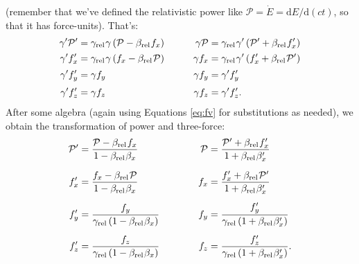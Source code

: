 \documentclass[12pt]{article}
\newcommand{\dd}[1]{\mathrm{d}#1}
\begin{document}
(remember that we've defined the relativistic power like $\mathcal{P} = \dot{E} = \dd E / \dd (ct)$, so that it has force-units). That's:
\begin{equation*}
\begin{aligned}
\gamma^\prime \mathcal{P}^\prime &= \gamma_{\textrm{rel}} \mkern1mu \gamma \left( \mathcal{P} - \beta_{\textrm{rel}} \mkern1mu f_x \right) \qquad & \gamma \mathcal{P} &= \gamma_{\textrm{rel}} \mkern1mu \gamma^\prime \left( \mathcal{P}^\prime + \beta_{\textrm{rel}} \mkern1mu f^\prime_x \right) \\[1pt]
\gamma^\prime f_x^\prime &= \gamma_{\textrm{rel}} \mkern1mu \gamma \left( f_x - \beta_{\textrm{rel}} \mkern1mu \mathcal{P} \right)  & \gamma f_x &= \gamma_{\textrm{rel}} \mkern1mu \gamma^\prime \left( f^\prime_x + \beta_{\textrm{rel}} \mkern1mu \mathcal{P}^\prime \right) \\[2pt]
\gamma^\prime f_y^\prime &= \gamma f_y & \gamma f_y &= \gamma^\prime f_y^\prime \\[2pt]
\gamma^\prime f_z^\prime &= \gamma f_z & \gamma f_z &= \gamma^\prime f_z^\prime.
\end{aligned}
\end{equation*}
After some algebra (again using Equations \ref{eq:fv} for substitutions as needed), we obtain the transformation of power and three-force:
\begin{equation}\label{eq:ft}
\begin{aligned}
\mathcal{P}^\prime &= \dfrac{\mathcal{P} - \beta_{\textrm{rel}} \mkern1mu f_x}{1 - \beta_{\textrm{rel}} \mkern1mu \beta_x} & \mathcal{P} &= \dfrac{\mathcal{P}^\prime + \beta_{\textrm{rel}} \mkern1mu f_x^\prime}{1 + \beta_{\textrm{rel}} \mkern1mu \beta_x^\prime} \\[6pt]
f_x^\prime &= \dfrac{f_x - \beta_{\textrm{rel}} \mkern1mu \mathcal{P} }{1 - \beta_{\textrm{rel}} \mkern1mu \beta_x} & f_x &= \dfrac{ f^\prime_x + \beta_{\textrm{rel}} \mkern1mu \mathcal{P}^\prime }{1 + \beta_{\textrm{rel}} \mkern1mu \beta^\prime_x} \\[5pt]
f_y^\prime &= \dfrac{f_y}{\gamma_{\textrm{rel}} \left( 1 - \beta_{\textrm{rel}} \mkern1mu \beta_x \right) } \qquad \quad & f_y &= \dfrac{f^\prime_y}{\gamma_{\textrm{rel}} \left( 1 + \beta_{\textrm{rel}} \mkern1mu \beta^\prime_x \right) } \\[5pt]
f_z^\prime &= \dfrac{f_z}{\gamma_{\textrm{rel}} \left( 1 - \beta_{\textrm{rel}} \mkern1mu \beta_x \right) } & f_z &= \dfrac{f^\prime_z}{\gamma_{\textrm{rel}} \left( 1 + \beta_{\textrm{rel}} \mkern1mu \beta^\prime_x \right) } .
\end{aligned}
\end{equation}
\end{document}

